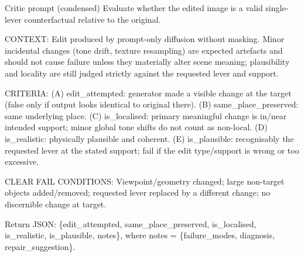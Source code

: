 \begin{promptbox}{Critic prompt (condensed)}
\scriptsize\ttfamily
Evaluate whether the edited image is a valid single-lever
counterfactual relative to the original.\par\medskip
CONTEXT: Edit produced by prompt-only diffusion without masking.
Minor incidental changes (tone drift, texture resampling) are
expected artefacts and should not cause failure unless they
materially alter scene meaning; plausibility and locality are still
judged strictly against the requested lever and support.\par\medskip
CRITERIA:
(A) edit\_attempted: generator made a visible change at the target
    (false only if output looks identical to original there).
(B) same\_place\_preserved: same underlying place.
(C) is\_localised: primary meaningful change is in/near intended
    support; minor global tone shifts do not count as non-local.
(D) is\_realistic: physically plausible and coherent.
(E) is\_plausible: recognisably the requested lever at the stated
    support; fail if the edit type/support is wrong or too
    excessive.\par\medskip
CLEAR FAIL CONDITIONS: Viewpoint/geometry changed; large non-target
objects added/removed; requested lever replaced by a different
change; no discernible change at target.\par\medskip
Return JSON: \{edit\_attempted, same\_place\_preserved,
is\_localised, is\_realistic, is\_plausible, notes\}, where
notes = \{failure\_modes, diagnosis, repair\_suggestion\}.
\end{promptbox}
